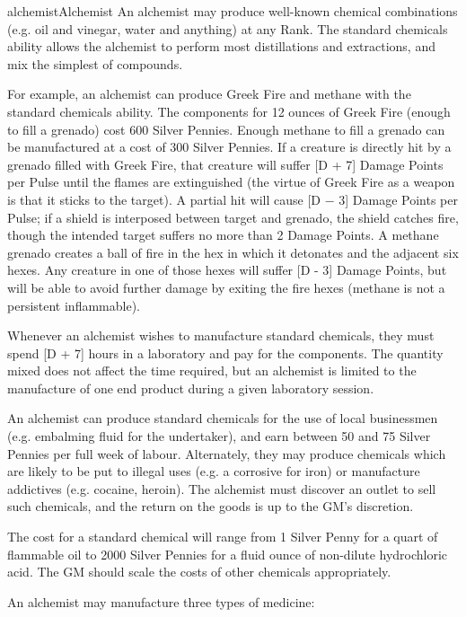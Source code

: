 \begin{Skill}[1.1]{alchemist}{Alchemist}
An alchemist may produce well-known chemical combinations (e.g. oil
and vinegar, water and anything) at any Rank. The standard chemicals
ability allows the alchemist to perform most distillations and
extractions, and mix the simplest of compounds.

For example, an alchemist can produce Greek Fire and methane with the
standard chemicals ability.  The components for 12 ounces of Greek
Fire (enough to fill a grenado) cost 600 Silver Pennies.  Enough
methane to fill a grenado can be manufactured at a cost of 300 Silver
Pennies. If a creature is directly hit by a grenado filled with Greek
Fire, that creature will suffer [D + 7] Damage Points per Pulse until
the flames are extinguished (the virtue of Greek Fire as a weapon is
that it sticks to the target).  A partial hit will cause [D − 3]
Damage Points per Pulse; if a shield is interposed between target and
grenado, the shield catches fire, though the intended target suffers
no more than 2 Damage Points. A methane grenado creates a ball of fire
in the hex in which it detonates and the adjacent six hexes.  Any
creature in one of those hexes will suffer [D - 3] Damage Points, but
will be able to avoid further damage by exiting the fire hexes
(methane is not a persistent inflammable).

Whenever an alchemist wishes to manufacture standard chemicals, they
must spend [D + 7] hours in a laboratory and pay for the components.
The quantity mixed does not affect the time required, but an alchemist
is limited to the manufacture of one end product during a given
laboratory session.

An alchemist can produce standard chemicals for the use of local
businessmen (e.g. embalming fluid for the undertaker), and earn
between 50 and 75 Silver Pennies per full week of labour. Alternately,
they may produce chemicals which are likely to be put to illegal uses
(e.g.  a corrosive for iron) or manufacture addictives (e.g.  cocaine,
heroin).  The alchemist must discover an outlet to sell such
chemicals, and the return on the goods is up to the GM’s discretion.

The cost for a standard chemical will range from 1 Silver Penny for a
quart of flammable oil to 2000 Silver Pennies for a fluid ounce of
non-dilute hydrochloric acid.  The GM should scale the costs of other
chemicals appropriately.


An alchemist may manufacture three types of medicine:


\end{Skill}

